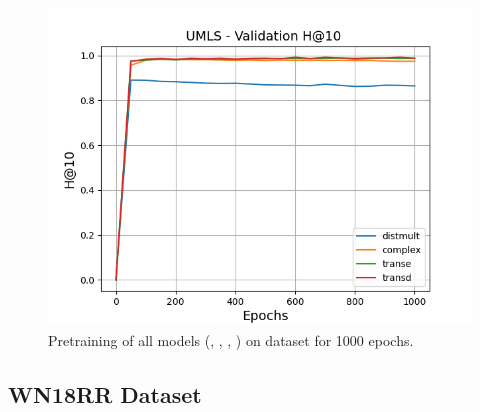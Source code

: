 \begin{figure}
\begin{minipage}{.3\textwidth}
      \includegraphics[width=0.9\linewidth]{figures/results/pretrain/umls/pretrain_umls_hit10s.png}
    \end{minipage}%
    \caption{Pretraining of all models (\distmult, \complex, \transe, \transd) on \umls dataset for 1000 epochs.}
    \label{fig:test}
\end{figure}

\subsection{WN18RR Dataset}

